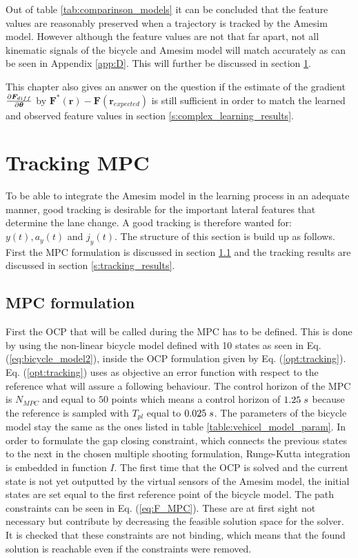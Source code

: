Out of table \ref{tab:comparinson_models} it can be concluded that the feature values are reasonably preserved when a trajectory is tracked by the Amesim model.  However although the feature values are not that far apart, not all kinematic signals of the bicycle and Amesim model will match accurately as can be seen in Appendix \ref{app:D}. This will further be discussed in section \ref{s:tracking_mpc}. 

This chapter also gives an answer on the question if the estimate of the gradient $\pdv{\bm{F}_{diff}}{\bm{\theta}}$ by $ \bm{F}^*(\bm{r}) - \bm{F}(\bm{r}_{expected})$ is still sufficient in order to match the learned and observed feature values in section \ref{s:complex_learning_results}.

\section{Tracking MPC} 
\label{s:tracking_mpc}
To be able to integrate the Amesim model in the learning process in an adequate manner, good tracking is desirable for the important lateral features that determine the lane change. A good tracking is therefore wanted for: $y(t), a_y(t)$ and $j_y(t)$. The structure of this section is build up as follows. First the MPC formulation is discussed in section \ref{s:mpc_form} and the tracking results are discussed in section \ref{s:tracking_results}.

\subsection{MPC formulation} \label{s:mpc_form}
First the OCP that will be called during the MPC has to be defined. This is done by using the non-linear bicycle model defined with 10 states as seen in Eq. (\ref{eq:bicycle_model2}), inside the OCP formulation given by Eq. (\ref{opt:tracking}). Eq. (\ref{opt:tracking}) uses as objective an error function with respect to the reference what will assure a following behaviour. The control horizon of the MPC is $N_{MPC}$ and equal to $50$ points which means a control horizon of $1.25 \hspace{1mm}s$ because the reference is sampled with $T_{pl}$ equal to $0.025\hspace{1mm}s$. The parameters of the bicycle model stay the same as the ones listed in table \ref{table:vehicel_model_param}. In order to formulate the gap closing constraint, which connects the previous states to the next in the chosen multiple shooting formulation, Runge-Kutta integration is embedded in function $I$.  
The first time that the OCP is solved and the current state is not yet outputted by the virtual sensors of the Amesim model, the initial states are set equal to the first reference point of the bicycle model. The path constraints can be seen in Eq. (\ref{eq:F_MPC}). These are at first sight not necessary but contribute by decreasing the feasible solution space for the solver. It is checked that these constraints are not binding, which means that the found solution is reachable even if the constraints were removed. 

